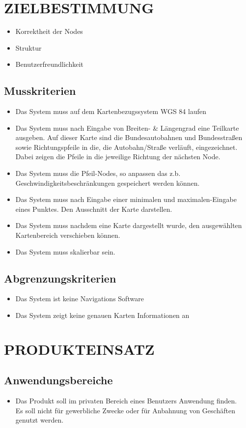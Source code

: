 \newpage
	\section{\Large ZIELBESTIMMUNG}
	\begin{itemize}
		\item Korrektheit der Nodes
		\item Struktur
		\item Benutzerfreundlichkeit
	\end{itemize}
	\subsection{Musskriterien}
	\begin{itemize}
		\item Das System muss auf dem Kartenbezugssystem WGS 84 laufen
		\item Das System muss nach Eingabe von Breiten- \& Längengrad eine Teilkarte ausgeben. Auf dieser Karte sind die Bundesautobahnen und Bundesstraßen sowie Richtungspfeile in die, die Autobahn/Straße verläuft, eingezeichnet. Dabei zeigen die Pfeile in die jeweilige Richtung der nächsten Node.
		\item Das System muss die Pfeil-Nodes, so anpassen das z.b. Geschwindigkeitsbeschränkungen gespeichert werden können.
		\item Das System muss nach Eingabe einer minimalen und maximalen-Eingabe eines Punktes. Den Ausschnitt der Karte darstellen.
		\item Das System muss nachdem eine Karte dargestellt wurde, den ausgewählten Kartenbereich verschieben können.
		\item Das System muss skalierbar sein.
	\end{itemize}
	\subsection{Abgrenzungskriterien}
	\begin{itemize}
		\item Das System ist keine Navigations Software
		\item Das System zeigt keine genauen Karten Informationen an
	\end{itemize}
	
	
	\section{\Large PRODUKTEINSATZ}
	\subsection{Anwendungsbereiche}
	\begin{itemize}
		\item Das Produkt soll im privaten Bereich eines Benutzers Anwendung finden.\\
		Es soll nicht für gewerbliche Zwecke oder für Anbahnung von Geschäften genutzt werden.
	\end{itemize}

